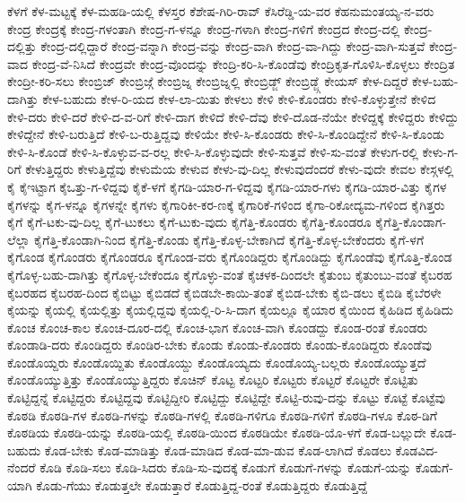 {ಕೆಳಗೆ
ಕೆಳ-ಮಟ್ಟಕ್ಕೆ
ಕೆಳ-ಮಹಡಿ-ಯಲ್ಲಿ
ಕೆಳಸ್ತರ
ಕೆಶೇಷ-ಗಿರಿ-ರಾವ್
ಕೆಸಿರೆಡ್ಡಿ-ಯ-ವರ
ಕೆಹನುಮಂತಯ್ಯ-ನ-ವರು
ಕೇಂದ್ರ
ಕೇಂದ್ರಕ್ಕೆ
ಕೇಂದ್ರ-ಗಳಂತಾಗಿ
ಕೇಂದ್ರ-ಗ-ಳನ್ನೂ
ಕೇಂದ್ರ-ಗಳಾಗಿ
ಕೇಂದ್ರ-ಗಳಿಗೆ
ಕೇಂದ್ರದ
ಕೇಂದ್ರ-ದಲ್ಲಿ
ಕೇಂದ್ರ-ದಲ್ಲಿತ್ತು
ಕೇಂದ್ರ-ದಲ್ಲಿದ್ದಾರೆ
ಕೇಂದ್ರ-ವನ್ನಾಗಿ
ಕೇಂದ್ರ-ವನ್ನು
ಕೇಂದ್ರ-ವಾಗಿ
ಕೇಂದ್ರ-ವಾ-ಗಿದ್ದು
ಕೇಂದ್ರ-ವಾಗಿ-ಸುತ್ತವೆ
ಕೇಂದ್ರ-ವಾದ
ಕೇಂದ್ರ-ವೆ-ನಿಸಿದೆ
ಕೇಂದ್ರವೇ
ಕೇಂದ್ರ-ವೊಂದನ್ನು
ಕೇಂದ್ರಿ-ಕರಿ-ಸಿ-ಕೊಂಡೆವು
ಕೇಂದ್ರಿಕೃತ-ಗೊಳಿಸಿ-ಕೊಳ್ಳಲು
ಕೇಂದ್ರಿತ
ಕೇಂದ್ರೀ-ಕರಿ-ಸಲು
ಕೇಂಬ್ರಿಜ್
ಕೇಂಬ್ರಿಜ್ಗೆ
ಕೇಂಬ್ರಿಜ್ನ
ಕೇಂಬ್ರಿಜ್ನಲ್ಲಿ
ಕೇಂಬ್ರಿಡ್ಜ್
ಕೇಂಬ್ರಿಡ್ಜ್ಗೆ
ಕೇಯಸ್
ಕೇಳ-ದಿದ್ದರೆ
ಕೇಳ-ಬಹು-ದಾಗಿತ್ತು
ಕೇಳ-ಬಹುದು
ಕೇಳ-ರಿ-ಯದ
ಕೇಳ-ಲಾ-ಯಿತು
ಕೇಳಲು
ಕೇಳಿ
ಕೇಳಿ-ಕೊಂಡರು
ಕೇಳಿ-ಕೊಳ್ಳುತ್ತೇನೆ
ಕೇಳಿದ
ಕೇಳಿ-ದರು
ಕೇಳಿ-ದರೆ
ಕೇಳಿ-ದ-ವ-ರಿಗೆ
ಕೇಳಿ-ದಾಗ
ಕೇಳಿದೆ
ಕೇಳಿ-ದೆವು
ಕೇಳಿ-ದೊಡ-ನೆಯೇ
ಕೇಳಿದ್ದಕ್ಕೆ
ಕೇಳಿದ್ದರು
ಕೇಳಿದ್ದು
ಕೇಳಿದ್ದೇನೆ
ಕೇಳಿ-ಬರುತ್ತಿದೆ
ಕೇಳಿ-ಬ-ರುತ್ತಿದ್ದವು
ಕೇಳಿಯೇ
ಕೇಳಿ-ಸಿ-ಕೊಂಡರು
ಕೇಳಿ-ಸಿ-ಕೊಂಡಿದ್ದೇನೆ
ಕೇಳಿ-ಸಿ-ಕೊಂಡು
ಕೇಳಿ-ಸಿ-ಕೊಂಡೆ
ಕೇಳಿ-ಸಿ-ಕೊಳ್ಳುವ-ವ-ರಲ್ಲ
ಕೇಳಿ-ಸಿ-ಕೊಳ್ಳುವುದೇ
ಕೇಳಿ-ಸುತ್ತವೆ
ಕೇಳಿ-ಸು-ವಂತೆ
ಕೇಳುಗ-ರಲ್ಲಿ
ಕೇಳು-ಗ-ರಿಗೆ
ಕೇಳುತ್ತಿದ್ದರು
ಕೇಳುತ್ತಿದ್ದೆವು
ಕೇಳುಮೆಯ
ಕೇಳುವ
ಕೇಳು-ವು-ದಿಲ್ಲ
ಕೇಳುವುದೆಂದರೆ
ಕೇಳು-ವುದೇ
ಕೇವಲ
ಕೇಸ್ಗಳಲ್ಲಿ
ಕೈ
ಕೈಇಟ್ಟಾಗ
ಕೈಒತ್ತು-ಗ-ಳಿದ್ದವು
ಕೈಕೆ-ಳಗೆ
ಕೈಗಡಿ-ಯಾರ-ಗ-ಳಿದ್ದವು
ಕೈಗಡಿ-ಯಾರ-ಗಳು
ಕೈಗಡಿ-ಯಾರ-ವಿತ್ತು
ಕೈಗಳ
ಕೈಗಳನ್ನು
ಕೈಗ-ಳನ್ನೂ
ಕೈಗಳನ್ನೇ
ಕೈಗಳು
ಕೈಗಾರಿಕೀ-ಕರ-ಣಕ್ಕೆ
ಕೈಗಾರಿಕೆ-ಗಳಿಂದ
ಕೈಗಾ-ರಿಕೋದ್ಯಮ-ಗಳಿಂದ
ಕೈಗಿತ್ತರು
ಕೈಗೆ
ಕೈಗೆ-ಟಕು-ವು-ದಿಲ್ಲ
ಕೈಗೆ-ಟುಕಲು
ಕೈಗೆ-ಟುಕು-ವುದು
ಕೈಗೆತ್ತಿ-ಕೊಂಡರು
ಕೈಗೆತ್ತಿ-ಕೊಂಡರೂ
ಕೈಗೆತ್ತಿ-ಕೊಂಡಾಗ-ಲೆಲ್ಲಾ
ಕೈಗೆತ್ತಿ-ಕೊಂಡಾಗಿ-ನಿಂದ
ಕೈಗೆತ್ತಿ-ಕೊಂಡು
ಕೈಗೆತ್ತಿ-ಕೊಳ್ಳ-ಬೇಕಾಗಿದೆ
ಕೈಗೆತ್ತಿ-ಕೊಳ್ಳ-ಬೇಕೆಂದರು
ಕೈಗೆ-ಳಗೆ
ಕೈಗೊಂಡ
ಕೈಗೊಂಡರು
ಕೈಗೊಂಡರೂ
ಕೈಗೊಂಡ-ವರು
ಕೈಗೊಂಡಿದ್ದರು
ಕೈಗೊಂಡಿದ್ದು
ಕೈಗೊಂಡೆವು
ಕೈಗೊತ್ತಿ-ಕೊಂಡ
ಕೈಗೊಳ್ಳ-ಬಹು-ದಾಗಿತ್ತು
ಕೈಗೊಳ್ಳ-ಬೇಕೆಂದೂ
ಕೈಗೊಳ್ಳು-ವಂತೆ
ಕೈಚಳಕ-ದಿಂದಲೇ
ಕೈತುಂಬ
ಕೈತುಂಬು-ವಂತೆ
ಕೈಬರಹ
ಕೈಬರಹದ
ಕೈಬರಹ-ದಿಂದ
ಕೈಬಿಟ್ಟು
ಕೈಬಿಡದೆ
ಕೈಬಿಡಬೇ-ಕಾಯಿ-ತಂತೆ
ಕೈಬಿಡ-ಬೇಕು
ಕೈಬಿ-ಡಲು
ಕೈಬಿಡಿ
ಕೈಬೆರಳೇ
ಕೈಯನ್ನು
ಕೈಯಲ್ಲಿ
ಕೈಯಲ್ಲಿತ್ತು
ಕೈಯಲ್ಲಿದ್ದವು
ಕೈಯಲ್ಲಿ-ರಿ-ಸಿ-ದಾಗ
ಕೈಯಲ್ಲೂ
ಕೈಯಾರ
ಕೈಯಿಂದ
ಕೈಹಿಡಿದ
ಕೈಹಿಡಿದು
ಕೊಂಚ
ಕೊಂಚ-ಕಾಲ
ಕೊಂಚ-ದೂರ-ದಲ್ಲಿ
ಕೊಂಚ-ಭಾಗ
ಕೊಂಚ-ವಾಗಿ
ಕೊಂಡದ್ದು
ಕೊಂಡ-ರಂತೆ
ಕೊಂಡರು
ಕೊಂಡಾಡಿ-ದರು
ಕೊಂಡಿದ್ದರು
ಕೊಂಡಿರ-ಬೇಕು
ಕೊಂಡು
ಕೊಂಡು-ಕೊಂಡರು
ಕೊಂಡು-ಕೊಂಡಿದ್ದರು
ಕೊಂಡೆವು
ಕೊಂಡೊಯ್ದರು
ಕೊಂಡೊಯ್ದಿತು
ಕೊಂಡೊಯ್ದು
ಕೊಂಡೊಯ್ಯದು
ಕೊಂಡೊಯ್ಯ-ಬಲ್ಲರು
ಕೊಂಡೊಯ್ಯುತ್ತದೆ
ಕೊಂಡೊಯ್ಯುತ್ತಿತ್ತು
ಕೊಂಡೊಯ್ಯುತ್ತಿದ್ದರು
ಕೊಚಿನ್
ಕೊಟ್ಟ
ಕೊಟ್ಟರಿ
ಕೊಟ್ಟರು
ಕೊಟ್ಟರೆ
ಕೊಟ್ಟರೇ
ಕೊಟ್ಟಿತು
ಕೊಟ್ಟಿದ್ದನ್ನೆ
ಕೊಟ್ಟಿದ್ದರು
ಕೊಟ್ಟಿದ್ದವು
ಕೊಟ್ಟಿದ್ದೀರಿ
ಕೊಟ್ಟಿದ್ದು
ಕೊಟ್ಟಿದ್ದೇ
ಕೊಟ್ಟಿ-ರುವು-ದನ್ನು
ಕೊಟ್ಟು
ಕೊಟ್ಟೆ
ಕೊಟ್ಟೆವು
ಕೊಠಡಿ
ಕೊಠಡಿ-ಗಳ
ಕೊಠಡಿ-ಗಳನ್ನು
ಕೊಠಡಿ-ಗಳಲ್ಲಿ
ಕೊಠಡಿ-ಗಳಿಗೂ
ಕೊಠಡಿ-ಗಳಿಗೆ
ಕೊಠಡಿ-ಗಳೂ
ಕೊಠ-ಡಿಗೆ
ಕೊಠಡಿಯ
ಕೊಠಡಿ-ಯನ್ನು
ಕೊಠಡಿ-ಯಲ್ಲಿ
ಕೊಠಡಿ-ಯಿಂದ
ಕೊಠಡಿಯೇ
ಕೊಠಡಿ-ಯೊ-ಳಗೆ
ಕೊಡ-ಬಲ್ಲುದೇ
ಕೊಡ-ಬಹುದು
ಕೊಡ-ಬೇಕು
ಕೊಡ-ಮಾಡಿತ್ತು
ಕೊಡ-ಮಾಡಿದ
ಕೊಡ-ಮಾ-ಡುವ
ಕೊಡ-ಲಾಗಿದೆ
ಕೊಡಲು
ಕೊಡವಿದ-ನೆಂದರೆ
ಕೊಡಿ
ಕೊಡಿ-ಸಲು
ಕೊಡಿ-ಸಿದರು
ಕೊಡಿ-ಸು-ವುದಕ್ಕೆ
ಕೊಡುಗೆ
ಕೊಡುಗೆ-ಗಳನ್ನು
ಕೊಡುಗೆ-ಯನ್ನು
ಕೊಡುಗೆ-ಯಾಗಿ
ಕೊಡು-ಗೆಯು
ಕೊಡುತ್ತಲೇ
ಕೊಡುತ್ತಾರೆ
ಕೊಡುತ್ತಿದ್ದ-ರಂತೆ
ಕೊಡುತ್ತಿದ್ದರು
ಕೊಡುತ್ತಿದ್ದೆ
}

